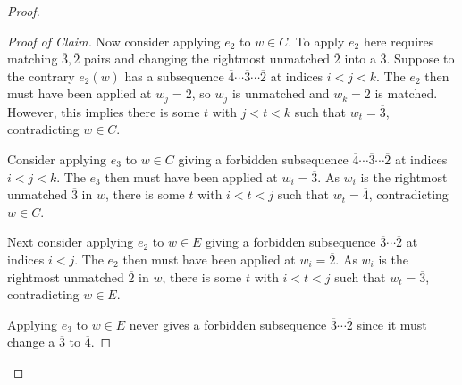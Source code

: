 \documentclass{amsart}
\newcommand{\shortversion}[1]{$\lceil$#1$\rfloor$}
\theoremstyle{definition}
\theoremstyle{remark}
\numberwithin{equation}{section}
\begin{document}
\begin{proof}
\begin{proof}[Proof of Claim]
Now consider applying $e_2$ to $w \in C$. To apply $e_2$ here requires matching $\overline{3}, \overline{2}$ pairs and changing the rightmost unmatched $\overline{2}$ into a $\overline{3}$. Suppose to the contrary $e_2(w)$ has a subsequence $\overline{4}\cdots\overline{3}\cdots\overline{2}$ at indices $i < j < k$. The $e_2$ then must have been applied at $w_j = \overline{2}$, so $w_j$ is unmatched and $w_k=\overline{2}$ is matched. However, this implies there is some $t$ with $j < t < k$ such that $w_t=\overline{3}$, contradicting $w \in C$. 


Consider applying $e_3$ to $w \in C$ giving a forbidden subsequence $\overline{4}\cdots\overline{3}\cdots\overline{2}$ at indices $i < j < k$. The $e_3$ then must have been applied at $w_i=\overline{3}$. As $w_i$ is the rightmost unmatched $\overline{3}$ in $w$, there is some $t$ with $i<t<j$ such that $w_t=\overline{4}$, contradicting $w \in C$.

Next consider applying $e_2$ to $w \in E$ giving a forbidden subsequence  $\overline{3}\cdots\overline{2}$ at indices $i < j$. The $e_2$ then must have been applied at $w_i=\overline{2}$. As $w_i$ is the rightmost unmatched $\overline{2}$ in $w$, there is some $t$ with $i<t<j$ such that $w_t=\overline{3}$, contradicting $w \in E$.

Applying $e_3$ to $w \in E$ never gives a forbidden subsequence $\overline{3}\cdots\overline{2}$ since it must change a $\overline{3}$ to $\overline{4}$.


\end{proof}
\end{proof}
\end{document}

